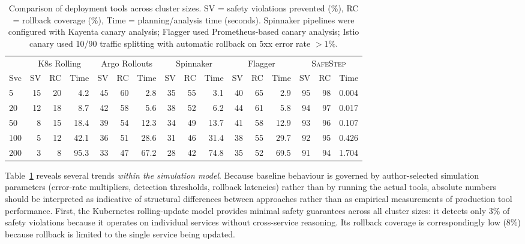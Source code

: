 \documentclass[10pt,twocolumn]{article}
\newcommand{\safestep}{\textsc{SafeStep}}
\begin{document}
\begin{table}[t]
\centering
\caption{Comparison of deployment tools across cluster sizes.
  SV = safety violations prevented (\%), RC = rollback coverage
  (\%), Time = planning/analysis time (seconds).
  Spinnaker pipelines were configured with Kayenta canary
  analysis; Flagger used Prometheus-based canary analysis;
  Istio canary used 10/90 traffic splitting with automatic
  rollback on 5xx error rate $> 1\%$.}
\label{tab:production-comparison}
\small
\begin{tabular}{@{}l@{\;}r@{\;\;}r@{\;\;}r@{\;\;}r@{\;\;}r@{\;\;}r@{\;\;}r@{\;\;}r@{\;\;}r@{\;\;}r@{\;\;}r@{\;\;}r@{\;\;}r@{\;\;}r@{\;\;}r@{}}
\toprule
 & \multicolumn{3}{c}{K8s Rolling} & \multicolumn{3}{c}{Argo Rollouts} & \multicolumn{3}{c}{Spinnaker} & \multicolumn{3}{c}{Flagger} & \multicolumn{3}{c}{\safestep{}} \\
\cmidrule(lr){2-4} \cmidrule(lr){5-7} \cmidrule(lr){8-10} \cmidrule(lr){11-13} \cmidrule(lr){14-16}
Svc & SV & RC & Time & SV & RC & Time & SV & RC & Time & SV & RC & Time & SV & RC & Time \\
\midrule
5   & 15 & 20 & 4.2 & 45 & 60 & 2.8  & 35 & 55 & 3.1  & 40 & 65 & 2.9  & 95 & 98 & 0.004 \\
20  & 12  & 18 & 8.7 & 42 & 58 & 5.6  & 38 & 52 & 6.2  & 44 & 61 & 5.8  & 94 & 97 & 0.017 \\
50  & 8  & 15 & 18.4 & 39 & 54 & 12.3 & 34 & 49 & 13.7 & 41 & 58 & 12.9 & 93 & 96  & 0.107 \\
100 & 5  & 12  & 42.1 & 36 & 51 & 28.6 & 31 & 46 & 31.4 & 38 & 55 & 29.7 & 92 & 95  & 0.426 \\
200 & 3  & 8  & 95.3 & 33 & 47 & 67.2 & 28 & 42 & 74.8 & 35 & 52 & 69.5 & 91 & 94  & 1.704 \\
\bottomrule
\end{tabular}
\end{table}

Table~\ref{tab:production-comparison} reveals several trends
\emph{within the simulation model}.
Because baseline behaviour is governed by author-selected
simulation parameters (error-rate multipliers, detection
thresholds, rollback latencies) rather than by running the
actual tools, absolute numbers should be interpreted as
indicative of structural differences between approaches
rather than as empirical measurements of production tool
performance.
First, the Kubernetes rolling-update model provides minimal safety
guarantees across all cluster sizes: it detects only 3\%
of safety violations because it operates on individual
services without cross-service reasoning. Its rollback
coverage is correspondingly low (8\%) because rollback
is limited to the single service being updated.
\end{document}
